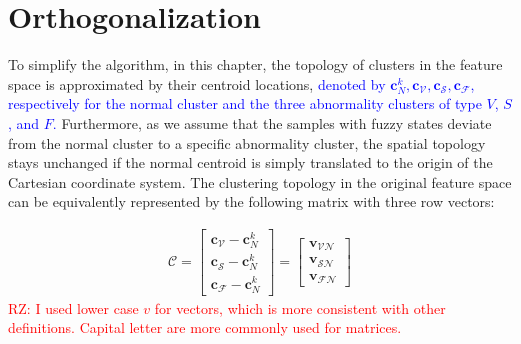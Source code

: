  
\section{Orthogonalization}

To simplify the algorithm, in this chapter, the topology of clusters in the feature space is approximated by their centroid locations, \textcolor{blue}{denoted by $\mathbf{c}_N^k, \mathbf{c}_{\mathcal{V}}, \mathbf{c}_{\mathcal{S}}, \mathbf{c}_{\mathcal{F}}$, respectively for the normal cluster and the three abnormality clusters of type $V$, $S$, and $F$.} Furthermore, as we assume that the samples with fuzzy states deviate from the normal cluster to a specific abnormality cluster, the spatial topology stays unchanged if the normal centroid is simply translated to the origin of the Cartesian coordinate system. The clustering topology in the original feature space can be equivalently represented by the following matrix with three row vectors:

\begin{align}
\mathcal{C} = 
\begin{bmatrix}
\mathbf{c}_{\mathcal{V}} - \mathbf{c}_N^k \\
\mathbf{c}_{\mathcal{S}} - \mathbf{c}_N^k \\
\mathbf{c}_{\mathcal{F}} - \mathbf{c}_N^k
\end{bmatrix} = 
\begin{bmatrix}
\mathbf{v}_{\mathcal{VN}} \\
\mathbf{v}_{\mathcal{SN}} \\
\mathbf{v}_{\mathcal{FN}}
\end{bmatrix}
\end{align}
\textcolor{red}{RZ: I used lower case $v$ for vectors, which is more consistent with other definitions. Capital letter are more commonly used for matrices.}

